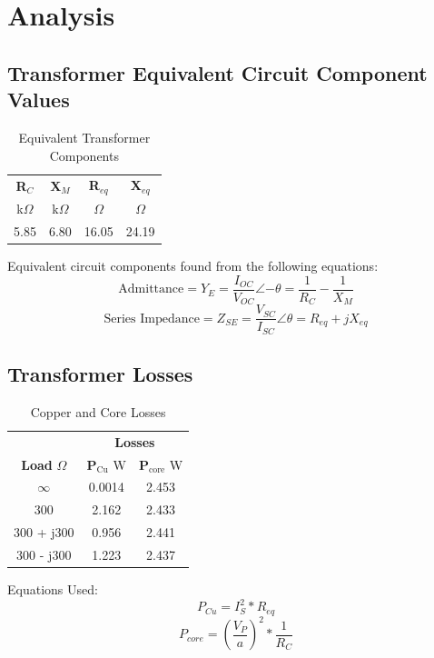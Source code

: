 \documentclass{article}
\begin{document}
\section{Analysis}
\subsection{Transformer Equivalent Circuit Component Values}
\begin{table}[H]
  \centering
  \begin{tabular}{*{4}{c}}
    \textbf{R$_C$} & \textbf{X$_M$}
    & \textbf{R$_{eq}$} & \textbf{X$_{eq}$} \\
    k$\Omega$ & k$\Omega$ &$\Omega$ & $\Omega$ \\
    \hline
    5.85 & 6.80 & 16.05 & 24.19 \\
  \end{tabular}
  \caption{Equivalent Transformer Components}
  \label{tab:equiv_comp}
\end{table}

Equivalent circuit components found from the following equations:
\[\text{Admittance} = Y_E = \frac{I_{OC}}{V_{OC}}\angle{-\theta} =  \frac{1}{R_C} -
\frac{1}{X_M}\]
\[\text{Series Impedance} = Z_{SE} = \frac{V_{SC}}{I_{SC}}\angle{\theta} = R_{eq} +
jX_{eq}\]

\subsection{Transformer Losses}
\begin{table}[H]
  \centering
  \begin{tabular}{*{3}{c}}
    & \multicolumn{2}{c}{\textbf{Losses}} \\
    \textbf{Load} $\Omega$ & \textbf{P$_\text{Cu}$} W & \textbf{P$_\text{core}$} W \\
    \hline
    $\infty$ & 0.0014 & 2.453 \\
    300 & 2.162 & 2.433 \\
    300 + j300 & 0.956 & 2.441 \\
    300 - j300 & 1.223 & 2.437 \\
  \end{tabular}
  \caption{Copper and Core Losses}
  \label{tab:power_losses}
\end{table}

Equations Used:
\[P_{Cu} = I_S^2 * R_{eq}\]
\[P_{core} = (\frac{V_P}{a})^2 * \frac{1}{R_{C}}\]
\end{document}
